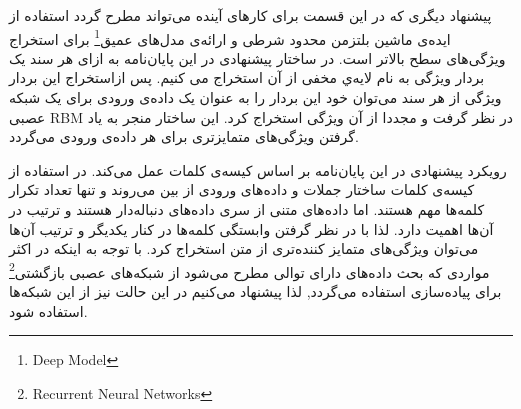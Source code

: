 
پیشنهاد دیگری که در این قسمت برای کارهای آینده می‌تواند مطرح گردد استفاده از اید‌ه‌ی ماشین بلتزمن محدود شرطی و ارائه‌ی مدل‌های عمیق\footnote{Deep Model}
برای استخراج ویژگی‌های سطح بالاتر است. در ساختار پیشنهادی در این پایان‌‌نامه به ازای هر سند یک بردار ویژگی به نام لایه‌ي مخفی
از آن استخراج می کنیم. پس ازاستخراج این بردار ویژگی از هر سند می‌توان خود این بردار را به عنوان یک داده‌ی ورودی برای یک شبکه عصبی 
RBM
در نظر گرفت و مجددا از آن ویژگی استخراج کرد. این ساختار منجر به یاد گرفتن ویژگی‌های متمایزتری برای هر داده‌ی ورودی می‌گردد.

رویکرد پیشنهادی در این پایان‌‌نامه بر اساس کیسه‌ی کلمات عمل می‌کند. در استفاده از کیسه‌ی کلمات ساختار جملات و داده‌های ورودی از بین می‌روند و تنها تعداد تکرار کلمه‌ها مهم هستند. اما داده‌های متنی از سری داده‌های دنباله‌دار هستند و ترتیب در آن‌ها اهمیت دارد. لذا با در نظر گرفتن وابستگی کلمه‌ها در کنار یکدیگر و ترتیب آن‌ها می‌توان ویژگی‌های متمایز کننده‌تری از متن استخراج کرد. با توجه به اینکه در اکثر مواردی که بحث داده‌های دارای توالی مطرح می‌شود از شبکه‌های عصبی بازگشتی\footnote{Recurrent Neural Networks}
برای پياده‌سازی استفاده می‌گردد, لذا پیشنهاد می‌کنیم در این حالت نیز از این شبکه‌ها استفاده شود.

%
